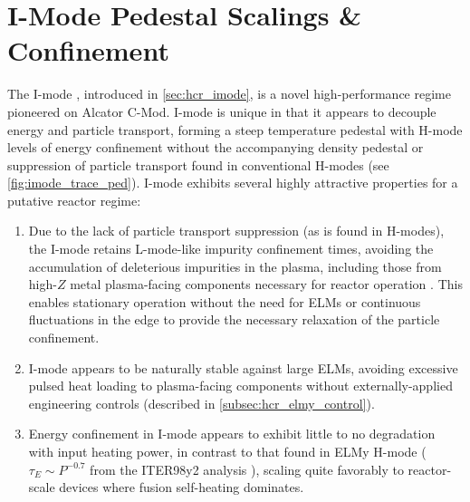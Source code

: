 \chapter{I-Mode Pedestal Scalings \& Confinement}\label{ch:ImodePedestal}

The I-mode \cite{Whyte2010,Hubbard2011,McDermott2009a,Cziegler2011,Cziegler2013}, introduced in \cref{sec:hcr_imode}, is a novel high-performance regime pioneered on Alcator C-Mod.  I-mode is unique in that it appears to decouple energy and particle transport, forming a steep temperature pedestal with H-mode levels of energy confinement without the accompanying density pedestal or suppression of particle transport found in conventional H-modes (see \cref{fig:imode_trace_ped}).  I-mode exhibits several highly attractive properties for a putative reactor regime:

\begin{enumerate}
 \item Due to the lack of particle transport suppression (as is found in H-modes), the I-mode retains L-mode-like impurity confinement times, avoiding the accumulation of deleterious impurities in the plasma, including those from high-$Z$ metal plasma-facing components necessary for reactor operation \cite{Loarte2007}.  This enables stationary operation without the need for ELMs or continuous fluctuations in the edge to provide the necessary relaxation of the particle confinement.
 \item I-mode appears to be naturally stable against large ELMs, avoiding excessive pulsed heat loading to plasma-facing components without externally-applied engineering controls (described in \cref{subsec:hcr_elmy_control}).
 \item Energy confinement in I-mode appears to exhibit little to no degradation with input heating power, in contrast to that found in ELMy H-mode ($\tau_E \sim P^{-0.7}$ from the ITER98y2 analysis \cite{ITER1999}), scaling quite favorably to reactor-scale devices where fusion self-heating dominates.
\end{enumerate}


